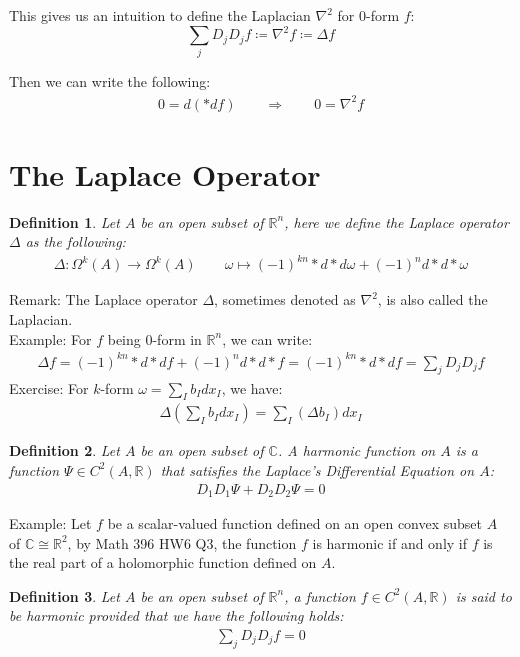 \documentclass[15pt]{book}
\theoremstyle{break}
\theoremstyle{break}
\newtheorem{defn}{Definition}[corL]
\newcommand{\R}{\mathbb{R}}
\newcommand{\Complex}{\mathbb{C}}
\newcommand{\remark}{\color{blue}Remark: \color{black}}
\newcommand{\example}{\color{green}Example: \color{black}}
\newcommand{\exercise}{\color{green}Exercise: \color{black}}
\begin{document}
This gives us an intuition to define the Laplacian $\nabla^2$ for $0$-form $f$:
$$\sum_j D_jD_j f \coloneqq \nabla^2 f \coloneqq \Delta f$$

Then we can write the following:
\begin{align*}
0 = d(*df) \qquad \Rightarrow \qquad 0 = \nabla^2 f
\end{align*}
\newpage

\section[The Laplace Operator]{\color{red}The Laplace Operator\color{black}}
\begin{defn}
Let $A$ be an open subset of $\R^n$, here we define the Laplace operator $\Delta$ as the following:
\begin{align*}
\Delta: \Omega^k(A) \to \Omega^k(A) \qquad \omega \mapsto (-1)^{kn}*d*d\omega +(-1)^n d*d*\omega
\end{align*}
\end{defn}
\remark The Laplace operator $\Delta$, sometimes denoted as $\nabla^2$, is also called the Laplacian.\\

\example
For $f$ being $0$-form in $\R^n$, we can write:
\begin{align*}
\Delta f = (-1)^{kn}*d*df +(-1)^n d*d*f = (-1)^{kn}*d*df = \sum_j D_j D_j f
\end{align*}
\exercise
For $k$-form $\omega = \sum_I b_I dx_I$, we have:
\begin{align*}
\Delta\left(\sum_I b_I dx_I\right) = \sum_I\left(\Delta b_I\right)dx_I
\end{align*}

\begin{defn}
Let $A$ be an open subset of $\Complex$. A harmonic function on $A$ is a function $\Psi \in C^2(A,\R)$ that satisfies the Laplace's Differential Equation on $A$:
\begin{align*}
D_1D_1 \Psi + D_2D_2 \Psi = 0
\end{align*}
\end{defn}

\example
Let $f$ be a scalar-valued function defined on an open convex subset $A$ of $\Complex \cong \R^2$, by Math 396 HW6 Q3, the function $f$ is harmonic if and only if $f$ is the real part of a holomorphic function defined on $A$.

\begin{defn}
Let $A$ be an open subset of $\R^n$, a function $f\in C^2(A,\R)$ is said to be harmonic provided that we have the following holds:
\begin{align*}
\sum_{j}D_j D_j f = 0
\end{align*}
\end{defn}
\end{document}
